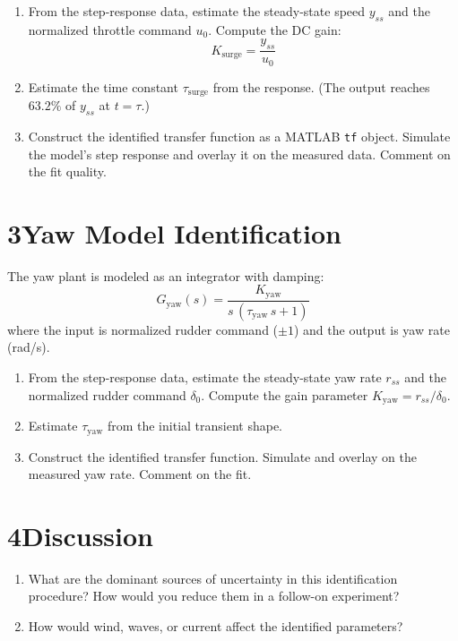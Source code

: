 \documentclass[11pt]{article}
\begin{document}
\begin{enumerate}[resume]

\item From the step-response data, estimate the steady-state speed $y_{ss}$ and
  the normalized throttle command $u_0$.  Compute the DC gain:
  \[
    K_{\mathrm{surge}} = \frac{y_{ss}}{u_0}
  \]

\item Estimate the time constant $\tau_{\mathrm{surge}}$ from the response.
  (The output reaches $63.2\%$ of $y_{ss}$ at $t = \tau$.)

\item Construct the identified transfer function as a MATLAB \texttt{tf} object.
  Simulate the model's step response and overlay it on the measured data.
  Comment on the fit quality.

\end{enumerate}

\section*{3\quad Yaw Model Identification}

The yaw plant is modeled as an integrator with damping:
\[
  G_{\mathrm{yaw}}(s) = \frac{K_{\mathrm{yaw}}}{s\,(\tau_{\mathrm{yaw}}\,s + 1)}
\]
where the input is normalized rudder command ($\pm 1$) and the output is yaw rate (rad/s).

\begin{enumerate}[resume]

\item From the step-response data, estimate the steady-state yaw rate $r_{ss}$
  and the normalized rudder command $\delta_0$.  Compute the gain parameter
  $K_{\mathrm{yaw}} = r_{ss}/\delta_0$.

\item Estimate $\tau_{\mathrm{yaw}}$ from the initial transient shape.

\item Construct the identified transfer function.  Simulate and overlay on the
  measured yaw rate.  Comment on the fit.

\end{enumerate}

\section*{4\quad Discussion}

\begin{enumerate}[resume]

\item What are the dominant sources of uncertainty in this identification
  procedure?  How would you reduce them in a follow-on experiment?

\item How would wind, waves, or current affect the identified parameters?

\end{enumerate}
\end{document}
